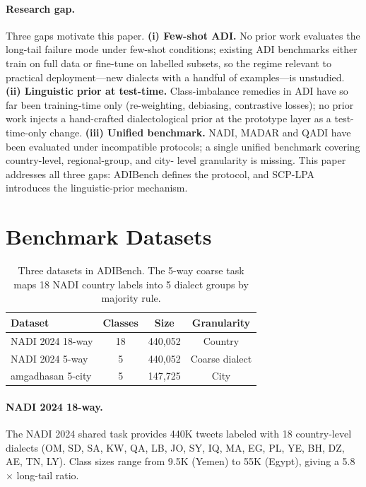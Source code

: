 \documentclass[11pt]{article}
\newcommand{\bench}{ADIBench}
\begin{document}
\paragraph{Research gap.}
Three gaps motivate this paper. \textbf{(i) Few-shot ADI.}
No prior work evaluates the long-tail failure mode under
few-shot conditions; existing ADI benchmarks either train on
full data or fine-tune on labelled subsets, so the regime
relevant to practical deployment---new dialects with a handful
of examples---is unstudied. \textbf{(ii) Linguistic prior at
test-time.} Class-imbalance remedies in ADI have so far been
training-time only (re-weighting, debiasing, contrastive
losses); no prior work injects a hand-crafted dialectological
prior at the prototype layer as a test-time-only change.
\textbf{(iii) Unified benchmark.} NADI, MADAR and QADI have
been evaluated under incompatible protocols; a single unified
benchmark covering country-level, regional-group, and city-
level granularity is missing. This paper addresses all three
gaps: \bench{} defines the protocol, and SCP-LPA introduces
the linguistic-prior mechanism.

\section{Benchmark Datasets}
\label{sec:datasets}

\begin{table}[t]
\centering\footnotesize
{\setlength{\tabcolsep}{4pt}
\begin{tabular}{lccc}
\toprule
Dataset & Classes & Size & Granularity \\
\midrule
NADI 2024 18-way & 18 & 440,052 & Country \\
NADI 2024 5-way & 5 & 440,052 & Coarse dialect \\
amgadhasan 5-city & 5 & 147,725 & City \\
\bottomrule
\end{tabular}}
\caption{Three datasets in \bench{}. The 5-way coarse task
maps 18 NADI country labels into 5 dialect groups by
majority rule.}
\label{tab:datasets}
\end{table}

\paragraph{NADI 2024 18-way.}
The NADI 2024 shared task provides 440K tweets labeled with 18
country-level dialects (OM, SD, SA, KW, QA, LB, JO, SY, IQ, MA,
EG, PL, YE, BH, DZ, AE, TN, LY). Class sizes range from 9.5K
(Yemen) to 55K (Egypt), giving a 5.8$\times$ long-tail ratio.
\end{document}

